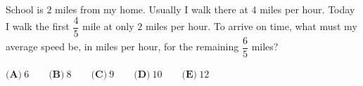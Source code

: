 School is $2$ miles from my home. Usually I walk there at $4$ miles per hour. Today I walk the first $\dfrac45$ mile at only $2$ miles per hour. To arrive on time, what must my average speed be, in miles per hour, for the remaining $\dfrac65$ miles?

$\textbf{(A)}\ 6\qquad\textbf{(B)}\ 8\qquad\textbf{(C)}\ 9\qquad\textbf{(D)}\ 10\qquad\textbf{(E)}\ 12$
